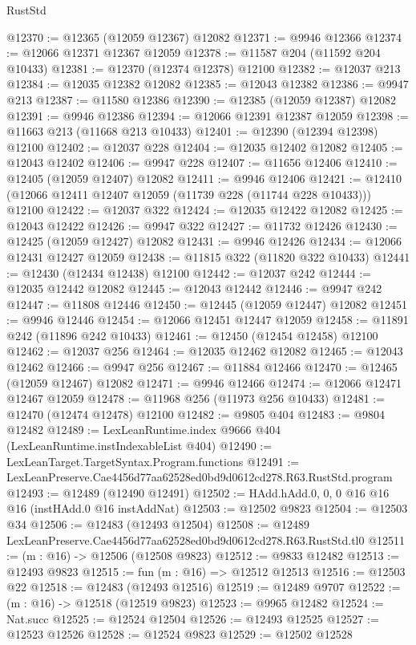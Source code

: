 \begin{lexlean}{RustStd}
\begin{coremodule}
@12370 := @12365 (@12059 @12367) @12082
@12371 := @9946 @12366
@12374 := @12066 @12371 @12367 @12059
@12378 := @11587 @204 (@11592 @204 @10433)
@12381 := @12370 (@12374 @12378) @12100
@12382 := @12037 @213
@12384 := @12035 @12382 @12082
@12385 := @12043 @12382
@12386 := @9947 @213
@12387 := @11580 @12386
@12390 := @12385 (@12059 @12387) @12082
@12391 := @9946 @12386
@12394 := @12066 @12391 @12387 @12059
@12398 := @11663 @213 (@11668 @213 @10433)
@12401 := @12390 (@12394 @12398) @12100
@12402 := @12037 @228
@12404 := @12035 @12402 @12082
@12405 := @12043 @12402
@12406 := @9947 @228
@12407 := @11656 @12406
@12410 := @12405 (@12059 @12407) @12082
@12411 := @9946 @12406
@12421 := @12410 (@12066 @12411 @12407 @12059 (@11739 @228 (@11744 @228 @10433))) @12100
@12422 := @12037 @322
@12424 := @12035 @12422 @12082
@12425 := @12043 @12422
@12426 := @9947 @322
@12427 := @11732 @12426
@12430 := @12425 (@12059 @12427) @12082
@12431 := @9946 @12426
@12434 := @12066 @12431 @12427 @12059
@12438 := @11815 @322 (@11820 @322 @10433)
@12441 := @12430 (@12434 @12438) @12100
@12442 := @12037 @242
@12444 := @12035 @12442 @12082
@12445 := @12043 @12442
@12446 := @9947 @242
@12447 := @11808 @12446
@12450 := @12445 (@12059 @12447) @12082
@12451 := @9946 @12446
@12454 := @12066 @12451 @12447 @12059
@12458 := @11891 @242 (@11896 @242 @10433)
@12461 := @12450 (@12454 @12458) @12100
@12462 := @12037 @256
@12464 := @12035 @12462 @12082
@12465 := @12043 @12462
@12466 := @9947 @256
@12467 := @11884 @12466
@12470 := @12465 (@12059 @12467) @12082
@12471 := @9946 @12466
@12474 := @12066 @12471 @12467 @12059
@12478 := @11968 @256 (@11973 @256 @10433)
@12481 := @12470 (@12474 @12478) @12100
@12482 := @9805 @404
@12483 := @9804 @12482
@12489 := LexLeanRuntime.index @9666 @404 (LexLeanRuntime.instIndexableList @404)
@12490 := LexLeanTarget.TargetSyntax.Program.functions
@12491 := LexLeanPreserve.Cae4456d77aa62528ed0bd9d0612cd278.R63.RustStd.program
@12493 := @12489 (@12490 @12491)
@12502 := HAdd.hAdd.{0, 0, 0} @16 @16 @16 (instHAdd.{0} @16 instAddNat)
@12503 := @12502 @9823
@12504 := @12503 @34
@12506 := @12483 (@12493 @12504)
@12508 := @12489 LexLeanPreserve.Cae4456d77aa62528ed0bd9d0612cd278.R63.RustStd.tl0
@12511 := (m : @16) -> @12506 (@12508 @9823)
@12512 := @9833 @12482
@12513 := @12493 @9823
@12515 := fun (m : @16) => @12512 @12513
@12516 := @12503 @22
@12518 := @12483 (@12493 @12516)
@12519 := @12489 @9707
@12522 := (m : @16) -> @12518 (@12519 @9823)
@12523 := @9965 @12482
@12524 := Nat.succ
@12525 := @12524 @12504
@12526 := @12493 @12525
@12527 := @12523 @12526
@12528 := @12524 @9823
@12529 := @12502 @12528

\end{coremodule}
\end{lexlean}
